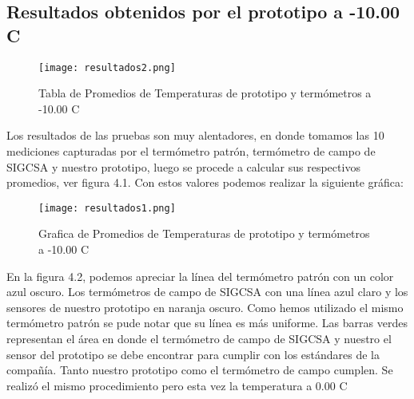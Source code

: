 \subsection{Resultados obtenidos por el prototipo a -10.00 C}

\begin{figure}[H]
	\centering
	\texttt{[image: resultados2.png]}
	\caption{Tabla de Promedios de Temperaturas de prototipo y termómetros a -10.00 C}
\end{figure}

\par \noindent 
Los resultados de las pruebas son muy alentadores, en donde tomamos las 10 mediciones capturadas por el termómetro patrón, termómetro de campo de SIGCSA y nuestro prototipo, luego se procede a calcular sus respectivos promedios, ver figura 4.1. Con estos valores podemos realizar la siguiente gráfica:

\begin{figure}[H]
	\centering
	\texttt{[image: resultados1.png]}
	\caption{Grafica de Promedios de Temperaturas de prototipo y termómetros a -10.00 C}
\end{figure}

\par \noindent
En la figura 4.2, podemos apreciar la línea del termómetro patrón con un color azul oscuro. Los termómetros de campo de SIGCSA con una línea azul claro y los sensores de nuestro prototipo en naranja oscuro. Como hemos utilizado el mismo termómetro patrón se pude notar que su línea es más uniforme. Las barras verdes representan el área en donde el termómetro de campo de SIGCSA y nuestro el sensor del prototipo se debe encontrar para cumplir con los estándares de la compañía. Tanto nuestro prototipo como el termómetro de campo cumplen. Se realizó el mismo procedimiento pero esta vez la temperatura a 0.00 C

